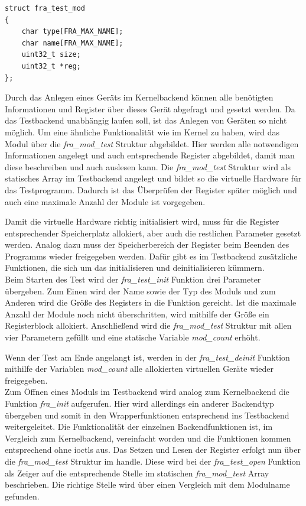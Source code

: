 \begin{lstfloat}
\begin{lstlisting}
struct fra_test_mod
{
	char type[FRA_MAX_NAME];
	char name[FRA_MAX_NAME];
	uint32_t size;
	uint32_t *reg;
};
\end{lstlisting}
\end{lstfloat}

Durch das Anlegen eines Geräts im Kernelbackend können alle benötigten Informationen und Register über dieses Gerät abgefragt und gesetzt werden. Da das Testbackend unabhängig laufen soll, ist das Anlegen von Geräten so nicht möglich. Um eine ähnliche Funktionalität wie im Kernel zu haben, wird das Modul über die \textit{fra\_mod\_test} Struktur abgebildet. Hier werden alle notwendigen Informationen angelegt und auch entsprechende Register abgebildet, damit man diese beschreiben und auch auslesen kann.
Die \textit{fra\_mod\_test} Struktur wird als statisches Array im Testbackend angelegt und bildet so die virtuelle Hardware für das Testprogramm. Dadurch ist das Überprüfen der Register später möglich und auch eine maximale Anzahl der Module ist vorgegeben. 


Damit die virtuelle Hardware richtig initialisiert wird, muss für die Register entsprechender Speicherplatz allokiert, aber auch die restlichen Parameter gesetzt werden. Analog dazu muss der Speicherbereich der Register beim Beenden des Programms wieder freigegeben werden. Dafür gibt es im Testbackend zusätzliche Funktionen, die sich um das initialisieren und deinitialisieren kümmern.\\

 
Beim Starten des Test wird der \textit{fra\_test\_init} Funktion drei Parameter übergeben. Zum Einen wird der Name sowie der Typ des Moduls und zum Anderen wird die Größe des Registers in die Funktion gereicht. Ist die maximale Anzahl der Module noch nicht überschritten, wird mithilfe der Größe ein Registerblock allokiert. Anschließend wird die \textit{fra\_mod\_test} Struktur mit allen vier Parametern gefüllt und eine statische Variable \textit{mod\_count} erhöht.

Wenn der Test am Ende angelangt ist, werden in der \textit{fra\_test\_deinit} Funktion mithilfe der Variablen \textit{mod\_count} alle allokierten virtuellen Geräte wieder freigegeben.\\


Zum Öffnen eines Moduls im Testbackend wird analog zum Kernelbackend die Funktion \textit{fra\_init} aufgerufen. Hier wird allerdings ein anderer Backendtyp übergeben und somit in den Wrapperfunktionen entsprechend ins Testbackend weitergeleitet. 
Die Funktionalität der einzelnen Backendfunktionen ist, im Vergleich zum Kernelbackend, vereinfacht worden und die Funktionen kommen entsprechend ohne \ac{ioctl}s aus. Das Setzen und Lesen der Register erfolgt nun über die \textit{fra\_mod\_test} Struktur im \gls{handle}. Diese wird bei der \textit{fra\_test\_open} Funktion als Zeiger auf die entsprechende Stelle im statischen \textit{fra\_mod\_test} Array beschrieben. Die richtige Stelle wird über einen Vergleich mit dem Modulname gefunden.\\



